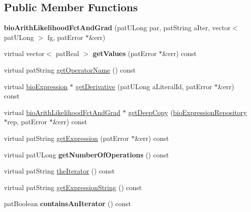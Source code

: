 \subsection*{Public Member Functions}
\begin{DoxyCompactItemize}
\item 
\mbox{\label{classbio_arith_likelihood_fct_and_grad_aa06f8d73f968bd6ade48202ac8d575c1}} 
{\bfseries bio\+Arith\+Likelihood\+Fct\+And\+Grad} (pat\+U\+Long par, pat\+String a\+Iter, vector$<$ pat\+U\+Long $>$ fg, pat\+Error $\ast$\&err)
\item 
\mbox{\label{classbio_arith_likelihood_fct_and_grad_a0dd5a4ad701db88338deffefe79a3101}} 
virtual vector$<$ pat\+Real $>$ {\bfseries get\+Values} (pat\+Error $\ast$\&err) const
\item 
virtual pat\+String \hyperlink{classbio_arith_likelihood_fct_and_grad_ad181305327744af1de885d4169888378}{get\+Operator\+Name} () const
\item 
virtual \hyperlink{classbio_expression}{bio\+Expression} $\ast$ \hyperlink{classbio_arith_likelihood_fct_and_grad_ab814e1cc11e481c88ba1d7401432c706}{get\+Derivative} (pat\+U\+Long a\+Literal\+Id, pat\+Error $\ast$\&err) const
\item 
virtual \hyperlink{classbio_arith_likelihood_fct_and_grad}{bio\+Arith\+Likelihood\+Fct\+And\+Grad} $\ast$ \hyperlink{classbio_arith_likelihood_fct_and_grad_a053e08511308e3c8a3e572f5c5f8f019}{get\+Deep\+Copy} (\hyperlink{classbio_expression_repository}{bio\+Expression\+Repository} $\ast$rep, pat\+Error $\ast$\&err) const
\item 
virtual pat\+String \hyperlink{classbio_arith_likelihood_fct_and_grad_ae264b073115dcff703cf2b7926384976}{get\+Expression} (pat\+Error $\ast$\&err) const
\item 
\mbox{\label{classbio_arith_likelihood_fct_and_grad_ad8862028e61ef7316833398e7ec3ff0c}} 
virtual pat\+U\+Long {\bfseries get\+Number\+Of\+Operations} () const
\item 
virtual pat\+String \hyperlink{classbio_arith_likelihood_fct_and_grad_ab7df38cb82ae1a9b77d51445931e1ac9}{the\+Iterator} () const
\item 
virtual pat\+String \hyperlink{classbio_arith_likelihood_fct_and_grad_a5f34a72c24f6d3e7215e82b2b9843e19}{get\+Expression\+String} () const
\item 
\mbox{\label{classbio_arith_likelihood_fct_and_grad_aa6d439996e243a4ef15f92ac9e426aef}} 
pat\+Boolean {\bfseries contains\+An\+Iterator} () const
\end{DoxyCompactItemize}
